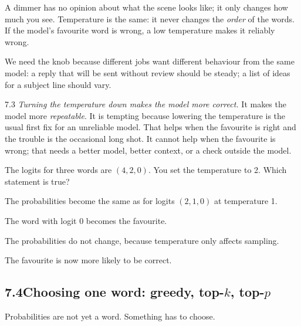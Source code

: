 \begin{breaks}
A dimmer has no opinion about what the scene looks like; it only changes how much you see. Temperature is the
same: it never changes the \emph{order} of the words. If the model's favourite word is wrong, a low temperature
makes it reliably wrong.
\end{breaks}

\Why We need the knob because different jobs want different behaviour from the same model: a reply that will be
sent without review should be steady; a list of ideas for a subject line should vary.

\begin{wrongidea}{7.3}
\emph{Turning the temperature down makes the model more correct.} It makes the model more \emph{repeatable}. It is
tempting because lowering the temperature is the usual first fix for an unreliable model. That helps when the favourite is right and the trouble is the occasional long shot.
It cannot help when the favourite is wrong; that needs a better model, better context, or a check outside the
model.
\end{wrongidea}

\begin{checkq}
The logits for three words are $(4, 2, 0)$. You set the temperature to 2. Which statement is true?
\begin{options}
\item The probabilities become the same as for logits $(2,1,0)$ at temperature 1.
\item The word with logit 0 becomes the favourite.
\item The probabilities do not change, because temperature only affects sampling.
\item The favourite is now more likely to be correct.
\end{options}
\end{checkq}


\subsection*{7.4\quad Choosing one word: greedy, top-$k$, top-$p$}

Probabilities are not yet a word. Something has to choose.

